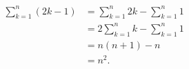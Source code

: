 \begin{equation*}
  \begin{split}
    \sum_{k = 1}^n (2k - 1) &= \sum_{k = 1}^n 2k - \sum_{k = 1}^n 1 \\
    &= 2 \sum_{k = 1}^n k - \sum_{k = 1}^n 1 \\
    &= n(n + 1) - n \\
    &= n^2.
  \end{split}
\end{equation*}
